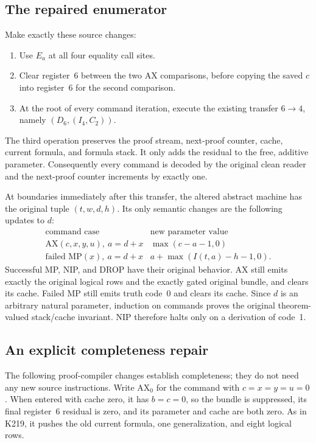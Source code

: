\subsection{The repaired enumerator}

Make exactly these source changes:
\begin{enumerate}
\item Use $E_a$ at all four equality call sites.
\item Clear register~6 between the two AX comparisons, before copying the
saved $c$ into register~6 for the second comparison.
\item At the root of every command iteration, execute the existing
transfer $6\mathbin{\to}4$, namely $(D_6,(I_4,C_2))$.
\end{enumerate}
The third operation preserves the proof stream, next-proof counter,
cache, current formula, and formula stack.  It only adds the residual
to the free, additive parameter.  Consequently every command is decoded
by the original clean reader and the next-proof counter increments by
exactly one.

At boundaries immediately after this transfer, the altered abstract
machine has the original tuple $(t,w,d,h)$.  Its only semantic changes are
the following updates to $d$:
\[
\begin{array}{c|c}
\text{command case}&\text{new parameter value}\\\hline
\mathrm{AX}(c,x,y,u),\ a=d+x
 &\max(c-a-1,0)\\
\text{failed }\mathrm{MP}(x),\ a=d+x
 &a+\max(I(t,a)-h-1,0).
\end{array}
\]
Successful MP, NIP, and DROP have their original behavior.  AX still
emits exactly the original logical rows and the exactly gated original
bundle, and clears its cache.  Failed MP still emits truth code~0 and
clears its cache.  Since $d$ is an arbitrary natural parameter, induction
on commands proves the original theorem-valued stack/cache invariant.
NIP therefore halts only on a derivation of code~1.

\subsection{An explicit completeness repair}

The following proof-compiler changes establish completeness; they do not
need any new source instructions.  Write $\mathrm{AX}_0$ for the command
with $c=x=y=u=0$.  When entered with cache zero, it has $b=c=0$, so the
bundle is suppressed, its final register~6 residual is zero, and its
parameter and cache are both zero.  As in K219, it pushes the old current
formula, one generalization, and eight logical rows.

